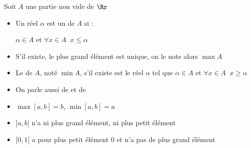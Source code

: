 \begin{frame}
\begin{mydefinition}
\label{def:max}

Soit $A$ une partie non vide de $\Rr$

\begin{itemize}
  \item Un réel $\alpha$ est un  de $A$ si :
 \centerline{$\alpha \in A$ \qquad  et \qquad  $\forall x \in A \;\; x\leq \alpha$} 

\pause

  \item S'il existe, le plus grand élément est unique, on le note alors $\max A$

\pause

  \item Le  de $A$, noté $\min A$, s'il existe est le réel
$\alpha$ tel que $\alpha \in A$ et $\forall x \in A \;\; x \ge \alpha$

\pause

  \item On parle aussi de  et de 
\end{itemize}
\end{mydefinition}


\pause

\begin{exemple}
\begin{itemize}
  \item $\max[a,b]=b$, $\min [a,b]=a$ 
\pause
  \item $]a,b[$ n'a ni plus grand élément, ni plus petit élément
\pause
  \item $[0,1[$ a pour plus petit élément $0$ et n'a pas de plus grand élément
\end{itemize}
\end{exemple}

\end{frame}


